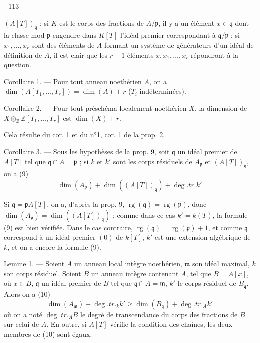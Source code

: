 \newpage


- 113 -

$(A[T])_{\mathfrak{q}}$ ; si $K$ est le corps des fractions de $A/\mathfrak{p}$, il y a un élément $x \in \mathfrak{q}$ dont la classe mod $\mathfrak{p}$ engendre dans $K[T]$ l'idéal premier correspondant à $\mathfrak{q}/\mathfrak{p}$ ; si $x_1, \dots, x_r$ sont des éléments de $A$ formant un système de générateurs d'un idéal de définition de $A$, il est clair que les $r+1$ éléments $x, x_1, \dots, x_r$ répondront à la question.

Corollaire 1. — Pour tout anneau noethérien $A$, on a $\dim(A[T_1, \dots, T_r]) = \dim(A)+r$ ($T_i$ indéterminées).

Corollaire 2. — Pour tout préschéma localement noethérien $X$, la dimension de $X \otimes_{\mathbb{Z}} \mathbb{Z}[T_1, \dots, T_r]$ est $\dim(X)+r$.

Cela résulte du cor. 1 et du n°1, cor. 1 de la prop. 2.

Corollaire 3. — Sous les hypothèses de la prop. 9, soit $\mathfrak{q}$ un idéal premier de $A[T]$ tel que $\mathfrak{q} \cap A = \mathfrak{p}$ ; si $k$ et $k'$ sont les corps résiduels de $A_{\mathfrak{p}}$ et $(A[T])_{\mathfrak{q}}$, on a
(9) $$\dim(A_{\mathfrak{p}}) + \dim((A[T])_{\mathfrak{q}}) + \deg.tr. k'$$

Si $\mathfrak{q} = \mathfrak{p}A[T]$, on a, d'après la prop. 9, $\operatorname{rg}(\mathfrak{q}) = \operatorname{rg}(\mathfrak{p})$, donc $\dim(A_{\mathfrak{p}}) = \dim((A[T])_{\mathfrak{q}})$ ; comme dans ce cas $k' = k(T)$, la formule (9) est bien vérifiée. Dans le cas contraire, $\operatorname{rg}(\mathfrak{q}) = \operatorname{rg}(\mathfrak{p}) + 1$, et comme $\mathfrak{q}$ correspond à un idéal premier $(0)$ de $k[T]$, $k'$ est une extension algébrique de $k$, et on a encore la formule (9).

Lemme 1. — Soient $A$ un anneau local intègre noethérien, $\mathfrak{m}$ son idéal maximal, $k$ son corps résiduel. Soient $B$ un anneau intègre contenant $A$, tel que $B = A[x]$, où $x \in B$, $\mathfrak{q}$ un idéal premier de $B$ tel que $\mathfrak{q} \cap A = \mathfrak{m}$, $k'$ le corps résiduel de $B_{\mathfrak{q}}$. Alors on a
(10) $$\dim(A_{\mathfrak{m}}) + \deg.tr._{k} k' \geq \dim(B_{\mathfrak{q}}) + \deg.tr._{A} k'$$
où on a noté $\deg.tr._{A} B$ le degré de transcendance du corps des fractions de $B$ sur celui de $A$. En outre, si $A[T]$ vérifie la condition des chaînes, les deux membres de (10) sont égaux.

